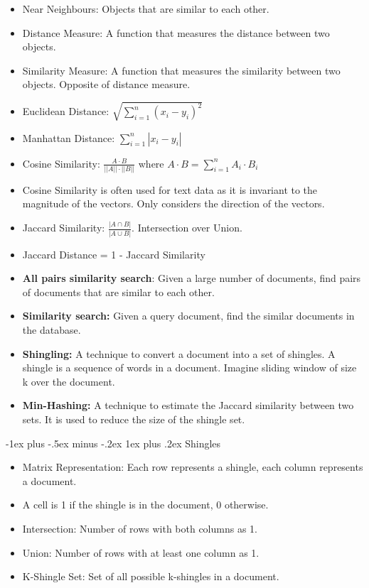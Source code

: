 \documentclass[10pt, landscape]{article}
\makeatletter
\renewcommand{\subsubsection}{\@startsection{subsubsection}{3}{0mm}%
  {-1ex plus -.5ex minus -.2ex}%
  {1ex plus .2ex}%
{\normalfont\small\bfseries}}%
\makeatother
\begin{document}
\begin{multicols*}{4}
  \begin{itemize}
    \item Near Neighbours: Objects that are similar to each other.
    \item Distance Measure: A function that measures the distance between two objects.
    \item Similarity Measure: A function that measures the similarity between two objects. Opposite of distance measure.
    \item Euclidean Distance: $\sqrt{\sum_{i=1}^{n} (x_i - y_i)^2}$
    \item Manhattan Distance: $\sum_{i=1}^{n} |x_i - y_i|$
    \item Cosine Similarity: $\frac{A \cdot B}{||A|| \cdot ||B||}$ where $A \cdot B = \sum_{i=1}^{n} A_i \cdot B_i$
    \item Cosine Similarity is often used for text data as it is invariant to the magnitude of the vectors. Only considers the direction of the vectors.
    \item Jaccard Similarity: $\frac{|A \cap B|}{|A \cup B|}$. Intersection over Union.
    \item Jaccard Distance = 1 - Jaccard Similarity
    \item \textbf{All pairs similarity search}: Given a large number of documents, find pairs of documents that are similar to each other.
    \item \textbf{Similarity search:} Given a query document, find the similar documents in the database.
    \item \textbf{Shingling:} A technique to convert a document into a set of shingles. A shingle is a sequence of words in a document. Imagine sliding window of size k over the document.
    \item \textbf{Min-Hashing:} A technique to estimate the Jaccard similarity between two sets. It is used to reduce the size of the shingle set.
  \end{itemize}

  \subsubsection{Shingles}
  \begin{itemize}
    \item Matrix Representation: Each row represents a shingle, each column represents a document. 
    \item A cell is 1 if the shingle is in the document, 0 otherwise.
    \item Intersection: Number of rows with both columns as 1. 
    \item Union: Number of rows with at least one column as 1.
    \item K-Shingle Set: Set of all possible k-shingles in a document.
  \end{itemize}


\end{multicols*}
\end{document}
